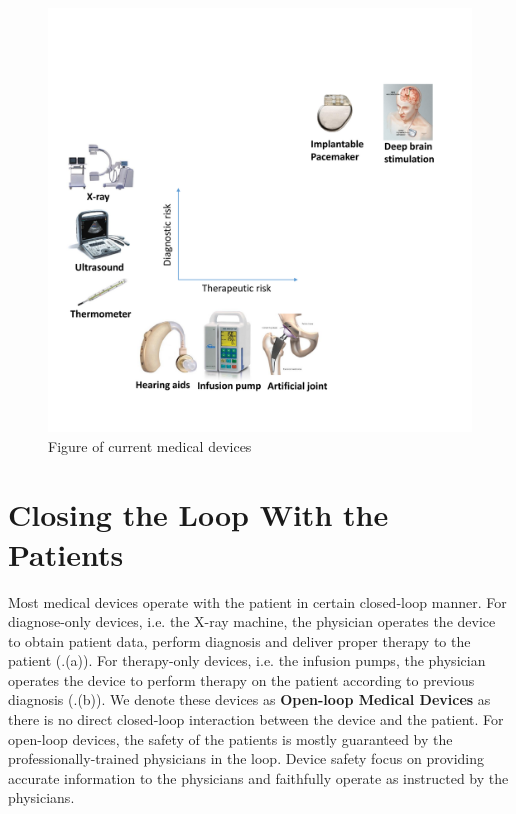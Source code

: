 \begin{figure}[t]
		\centering
		\includegraphics[width=\textwidth]{figs/devices_new.pdf}
		\caption{\small Figure of current medical devices}
		\label{fig:Cur}
\end{figure}


\section{Closing the Loop With the Patients}
Most medical devices operate with the patient in certain closed-loop manner. For diagnose-only devices, i.e. the X-ray machine, the physician operates the device to obtain patient data, perform diagnosis and deliver proper therapy to the patient (.(a)). For therapy-only devices, i.e. the infusion pumps, the physician operates the device to perform therapy on the patient according to previous diagnosis (.(b)). We denote these devices as \textbf{Open-loop Medical Devices} as there is no direct closed-loop interaction between the device and the patient. For open-loop devices, the safety of the patients is mostly guaranteed by the professionally-trained physicians in the loop. Device safety focus on providing accurate information to the physicians and faithfully operate as instructed by the physicians.

